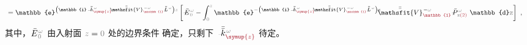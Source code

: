 \begin{align}
	&= \mathbb{e}^{\left( \mathbb{i} \Xint{\begin{smallmatrix} ~ \\ {}^{}_{\mathcolor{gray}{-}} \\ ~ \end{smallmatrix}}{15}{\bar{\bar{k}}}_{\textcolor{Maroon}{\symup{z}}}^{\;\! \mathcolor{gray}{\omega}} - \Xint{\mathcolor{gray}{-}}{25}{\bar{\bar{\mathsfit{V}}}}^{\;\! - \mathcolor{gray}{\omega}}_{\textcolor{Maroon}{\mathbb{1}}} \Xint{\mathcolor{gray}{-}}{32}{\bar{\bar{L}}}^{\;\! \mathcolor{gray}{\omega}} \right) \mathcolor{gray}{z}} \left[ \Xint{\mathcolor{gray}{-}}{295}{\bar{E}}^{\;\!\mathcolor{gray}{\omega}}_{\;\! \mathcolor{gray}{0}} - \int_{\mathcolor{gray}{0}}^{\mathcolor{gray}{z}} \mathbb{e}^{- \left( \mathbb{i} \Xint{\begin{smallmatrix} ~ \\ {}^{}_{\mathcolor{gray}{-}} \\ ~ \end{smallmatrix}}{15}{\bar{\bar{k}}}_{\textcolor{Maroon}{\symup{z}}}^{\;\! \mathcolor{gray}{\omega}} - \Xint{\mathcolor{gray}{-}}{25}{\bar{\bar{\mathsfit{V}}}}^{\;\! - \mathcolor{gray}{\omega}}_{\textcolor{Maroon}{\mathbb{1}}} \Xint{\mathcolor{gray}{-}}{32}{\bar{\bar{L}}}^{\;\! \mathcolor{gray}{\omega}} \right) \mathcolor{gray}{\mathtt{z}}} \cdot \Xint{\mathcolor{gray}{-}}{25}{\bar{\bar{\mathsfit{V}}}}^{\;\! - \mathcolor{gray}{\omega}}_{\textcolor{Maroon}{\mathbb{1}}} \Xint{\mathcolor{gray}{-}}{30}{\bar{P}}^{\;\! \mathcolor{gray}{\omega}}_{\;\! \mathcolor{gray}{\mathtt{z}} \textcolor{Maroon}{(2)}} ~\mathbb{d} \mathcolor{gray}{\mathtt{z}} \right] ~, \label{eq:simplify6-SVA-E'-V_1nonsingular-solution}
\end{align}
其中，$\Xint{\mathcolor{gray}{-}}{295}{\bar{E}}^{\;\!\mathcolor{gray}{\omega}}_{\;\! \mathcolor{gray}{0}}$ 由入射面 $\mathcolor{gray}{z \mathcolor{black}{=} 0}$ 处的边界条件  确定，只剩下 $\Xint{\begin{smallmatrix} ~ \\ {}^{}_{\mathcolor{gray}{-}} \\ ~ \end{smallmatrix}}{15}{\bar{\bar{k}}}_{\textcolor{Maroon}{\symup{z}}}^{\;\! \mathcolor{gray}{\omega}}$ 待定。

